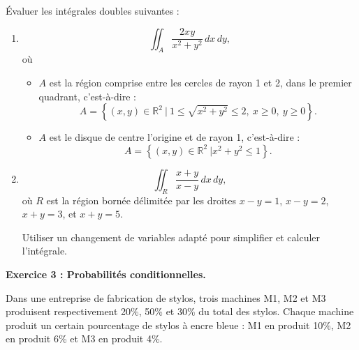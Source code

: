 \documentclass[a4paper,12pt]{article}
\begin{document}
Évaluer les intégrales doubles suivantes :  
\begin{enumerate}
\item
\[
	\iint_{A} \frac{2xy}{x^2 + y^2} \, {dx \, dy},
\]  
où 
\begin{itemize}
\item
\( A \) est la région comprise entre les cercles de rayon 1 et 2, dans le premier quadrant, c’est-à-dire :  
\[
A = \left\{ (x, y) \in \mathbb{R}^2 \ \big| \ 1 \leq \sqrt{x^2 + y^2} \leq 2,\ x \geq 0,\ y \geq 0 \right\}.
\]
\item
	$A$ est le disque de centre l'origine et de rayon 1,
	c'est-à-dire :
	$$A = \left\{ (x, y) \in \mathbb{R}^2 \ \big| x^2 + y^2 \leq 1 \right\}.$$
\end{itemize}

\item
\[
	\iint_{R} \frac{x + y}{x - y} \, {dx \, dy},
\]  
où \( R \) est la région bornée délimitée par les droites \( x - y = 1 \), \( x - y = 2 \), \( x + y = 3 \), et \( x + y = 5 \).

Utiliser un changement de variables adapté pour simplifier et calculer l'intégrale.




\end{enumerate}


\hline
\bigskip

\noindent
\textbf{Exercice 3 : Probabilités conditionnelles.}

Dans une entreprise de fabrication de stylos, trois machines M1, M2 et M3 produisent respectivement 20\%, 50\% et 30\% du total des stylos. Chaque machine produit un certain pourcentage de stylos à encre bleue : M1 en produit 10\%, M2 en produit 6\% et M3 en produit 4\%.
\end{document}
